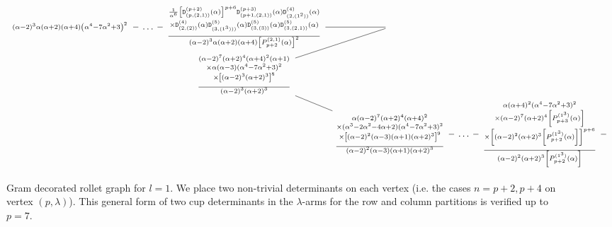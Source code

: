\documentclass{article}
\theoremstyle{definition}
\newcommand{\Deltt}{{\mathtt D}}   %
\newcommand{\Delttt}[2]{\Deltt^{#1}_{(#2)}}  %
\def\a{\alpha}
\def\l{\lambda}
\numberwithin{equation}{subsection}
\begin{document}
\begin{landscape}
\begin{figure}
\[\begin{tikzcd}[column sep=0.6em,row sep=0em]
\begin{smallmatrix}
    (\alpha -2)^3 \alpha  (\alpha +2) (\alpha +4) {\left(\alpha ^4-7 \alpha ^2+3\right)^2}
\end{smallmatrix}\ar[dash,r]&\dots\ar[dash,r]&\begin{smallmatrix}
\frac{1}{\a^6}
    \left[\Delttt{(p+2)}{p,(2,1)}(\a)\right]^{p+6}
    \Delttt{(p+3)}{p+1,(2,1)}(\a)\Delttt{(4)}{2,(1^2)}(\a)\\
    \times \Delttt{(4)}{2,(2)}(\a)\Delttt{(5)}{3,(1^3))}(\a)\Delttt{(5)}{3,(3)}(\a)\Delttt{(5)}{3,(2,1)}(\a)\\[0.5em] \hline
    (\a-2)^3\a (\a+2)(\a+4) \left[P^{(2,1)}_{p+2}(\a)\right]^2
\end{smallmatrix}\ar[dash,r]&{}\\
&&\begin{smallmatrix}(\a-2)^{7}(\a+2)^{4}(\a+4)^2(\a+1)\\
\times\a (\a-3){(\a^4-7\a^2+3)^2}\\
\times \left[(\a-2)^3(\a+2)^3\right]^8\\[0.5em] \hline
    (\a-2)^3(\a+2)^3
\end{smallmatrix}\arrow[dash,ur]\arrow[dash,dr]\\
&&&\begin{smallmatrix}\a (\a-2)^{7} (\a+2)^{4}  (\a+4)^2 \\
\times(\a^3-2\a^2-4\a+2){(\a^4-7\a^2+3)^2}\\
\times \left[(\a-2)^2(\a-3 )(\a+1)(\a+2)^3\right]^9 \\[0.5em] \hline
    (\a-2)^2(\a-3 )(\a+1)(\a+2)^3
\end{smallmatrix}\ar[dash,r]&\dots\ar[dash,r]&
    \begin{smallmatrix} \a (\a+4)^2  {(\a^4-7\a^2+3)^2}\\
    \times (\a-2)^7(\a+2)^4 \left[P^{(1^3)}_{p+3}(\a)\right] \\
    \times \left[(\a-2)^2(\a+2 )^3 \left[P^{(1^3)}_{p+2}(\a)\right]\right]^{p+6}\\[0.5em] \hline
        (\a-2)^2(\a+2 )^3\left[ P^{(1^3)}_{p+2}(\a)\right]
    \end{smallmatrix}\ar[dash,r]&{}
\end{tikzcd}\]    
    \caption{Gram decorated rollet graph for $l=1$. We place two non-trivial determinants on each vertex (i.e. the cases $n=p+2,p+4$ on vertex $(p,\l)$). This general form of two cup determinants in the $\l$-arms for the row and column partitions is verified up to $p=7$.}
\end{figure}
\end{landscape}
\end{document}
